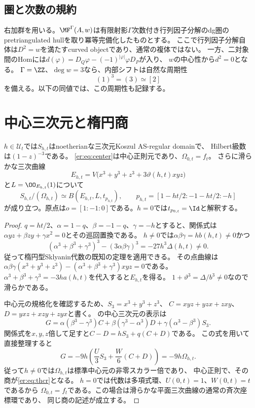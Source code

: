 \subsection{圏と次数の規約}
右加群を用いる。$\MF^\Gamma(A,w)$は有限射影$\Gamma$次数付き行列因子分解のdg圏の
pretriangulated hullを取り冪等完備化したものとする。
ここで行列因子分解自体は$D^2=w$を満たすcurved objectであり、通常の複体ではない。
一方、二対象間のHomには$d(\varphi)=D_Q\varphi-(-1)^{|\varphi|}\varphi D_P$が入り、
$w$の中心性から$d^2=0$となる。
$\Gamma=\ZZ$、$\deg w=3$なら、内部シフトは自然な周期性
\begin{equation}\label{er:eq:period}
 (1)^3=(3)\simeq[2]
\end{equation}
を備える。以下の同値では、この周期性も記録する。

\section{中心三次元と楕円商}\label{er:sec:algebra}
\begin{proposition}\label{er:prop:center}
$h\in\mathscr U_t$では$S_{h,t}$はnoetherianな三次元Koszul AS-regular domainで、
Hilbert級数は$(1-z)^{-3}$である。
\eqref{er:eq:center}は中心正則元であり、$\Omega_{0,t}=f_t$。
さらに滑らかな三次曲線
\[
 E_{h,t}=V\bigl(x^3+y^3+z^3+3\vartheta(h,t)xyz\bigr)
\]
と$L=\OO_{E_{h,t}}(1)$について
\begin{equation}\label{er:eq:thcr}
 S_{h,t}/(\Omega_{h,t})\simeq B(E_{h,t},L,t_{p_{h,t}}),
 \qquad
 p_{h,t}=[1-ht/2:-1-ht/2:-h]
\end{equation}
が成り立つ。原点は$o=[1:-1:0]$である。$h=0$では$t_{p_{0,t}}=\Id$と解釈する。
\end{proposition}
\begin{proof}
$q=ht/2$、$\alpha=1-q$、$\beta=-1-q$、$\gamma=-h$とすると、関係式は
$\alpha yz+\beta zy+\gamma x^2=0$とその巡回置換である。
$h\ne0$では$\alpha\beta\gamma=h b(h,t)\ne0$かつ
\[
 (\alpha^3+\beta^3+\gamma^3)^3-(3\alpha\beta\gamma)^3
 =-27h^3\Delta(h,t)\ne0.
\]
従って楕円型Sklyanin代数の既知の定理を適用できる\cite{SmithTate,Walton}。
その点曲線は
$\alpha\beta\gamma(x^3+y^3+z^3)-
(\alpha^3+\beta^3+\gamma^3)xyz=0$である。
$\alpha^3+\beta^3+\gamma^3=-3h a(h,t)$を代入すると$E_{h,t}$を得る。
$1+\vartheta^3=\Delta/b^3\ne0$なので滑らかである。

中心元の規格化を確認するため、$S_3=x^3+y^3+z^3$、
$C=xyz+yzx+zxy$、$D=yxz+xzy+zyx$と書く。
\cite[Section 2, p.~3]{DeLaetLeBruyn}の中心三次元の表示は
\[
 G=\alpha(\beta^3-\gamma^3)C+
   \beta(\gamma^3-\alpha^3)D+
   \gamma(\alpha^3-\beta^3)S_3.
\]
関係式を$x,y,z$倍して足すと$C-D=hS_3+q(C+D)$である。
この式を用いて直接整理すると
\begin{equation}\label{er:eq:central-identity}
 G=-9h\left(\frac U3 S_3+\frac W6(C+D)\right)=-9h\Omega_{h,t}.
\end{equation}
従って$h\ne0$では$\Omega_{h,t}$は標準中心元の非零スカラー倍であり、
中心正則で、その商が\eqref{er:eq:thcr}となる。
$h=0$では代数は多項式環、$U(0,t)=1$、$W(0,t)=t$であるから
$\Omega_{0,t}=f_t$である。この場合は滑らかな平面三次曲線の通常の斉次座標環であり、
同じ商の記述が成立する。
\end{proof}

